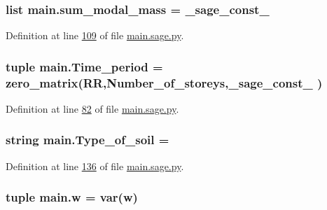 \hypertarget{namespacemain_a27fb93072b84fd448623807df350f132}{}
\subsubsection[{sum\+\_\+modal\+\_\+mass}]{\setlength{\rightskip}{0pt plus 5cm}list main.\+sum\+\_\+modal\+\_\+mass = \+\_\+sage\+\_\+const\+\_}\label{namespacemain_a27fb93072b84fd448623807df350f132}


Definition at line \hyperlink{main_8sage_8py_source_l00109}{109} of file \hyperlink{main_8sage_8py_source}{main.\+sage.\+py}.

\hypertarget{namespacemain_a6bf4b8266bcb3b4f390149620fea3d6c}{}
\subsubsection[{Time\+\_\+period}]{\setlength{\rightskip}{0pt plus 5cm}tuple main.\+Time\+\_\+period = zero\+\_\+matrix(R\+R,Number\+\_\+of\+\_\+storeys,\+\_\+sage\+\_\+const\+\_ )}\label{namespacemain_a6bf4b8266bcb3b4f390149620fea3d6c}


Definition at line \hyperlink{main_8sage_8py_source_l00082}{82} of file \hyperlink{main_8sage_8py_source}{main.\+sage.\+py}.

\hypertarget{namespacemain_a52e65712caa18dade1326ad4efeebfa1}{}
\subsubsection[{Type\+\_\+of\+\_\+soil}]{\setlength{\rightskip}{0pt plus 5cm}string main.\+Type\+\_\+of\+\_\+soil = \textquotesingle{}\textquotesingle{}}\label{namespacemain_a52e65712caa18dade1326ad4efeebfa1}


Definition at line \hyperlink{main_8sage_8py_source_l00136}{136} of file \hyperlink{main_8sage_8py_source}{main.\+sage.\+py}.

\hypertarget{namespacemain_af76005101c339a32cd5d37ba82ee072c}{}
\subsubsection[{w}]{\setlength{\rightskip}{0pt plus 5cm}tuple main.\+w = var(\textquotesingle{}w\textquotesingle{})}\label{namespacemain_af76005101c339a32cd5d37ba82ee072c}


